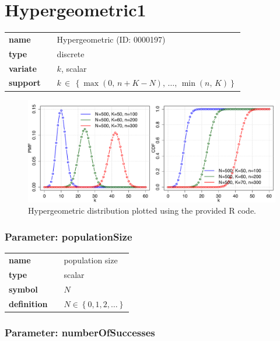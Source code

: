 \section*{Hypergeometric1} 

  \bigskip 

\begin{tabular}{p{2cm}cl}
\textbf{name} & & Hypergeometric (ID: 0000197)\\ 
 
\textbf{type} & & discrete \\ 

\textbf{variate} & & $k$, scalar \\ 

\textbf{support} & & $k\, \in\, \left\{\max{(0,\, n+K-N)},\, \dots,\, \min{(n,\, K )}\right\}$
\end{tabular}

\begin{figure}[ht!]
\centering
  \includegraphics[width=140mm]{pics/Hypergeometric.pdf}
 \caption{Hypergeometric distribution plotted using the provided R code.}
 \label{fig:Hypergeometric}
\end{figure}

\subsubsection*{Parameter: populationSize}

\noindent\begin{tabular}{p{2cm}cl}
\textbf{name} & & population size \\
\textbf{type} & & scalar \\
\textbf{symbol} & & $N$  \\
\textbf{definition} & & $N \in \left\{0,1,2,\dots\right\}$
\end{tabular}
\subsubsection*{Parameter: numberOfSuccesses}

